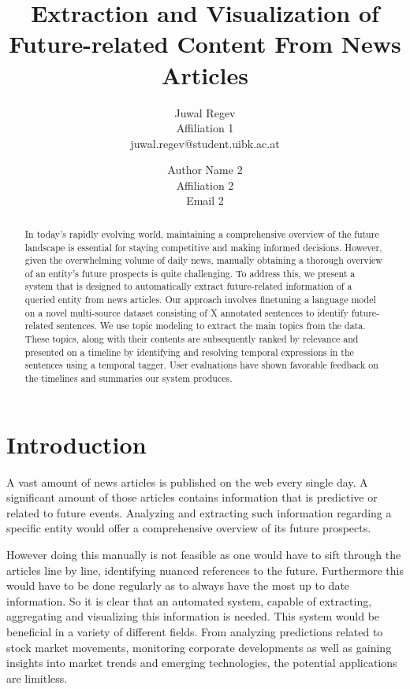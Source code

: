 \documentclass[10pt,twocolumn]{article}
\begin{document}

\title{\textbf{Extraction and Visualization of Future-related Content From News Articles}}
\author{
    Juwal Regev\\
    Affiliation 1\\
    juwal.regev@student.uibk.ac.at
    \and
    Author Name 2\\
    Affiliation 2\\
    Email 2
}
\date{} %

\maketitle

\begin{abstract}
In today's rapidly evolving world, maintaining a comprehensive overview of the future landscape is essential for staying competitive and making informed decisions. However, given the overwhelming volume of daily news, manually obtaining a thorough overview of an entity's future prospects is quite challenging. To address this, we present a system that is designed to automatically extract future-related information of a queried entity from news articles. Our approach involves finetuning a language model on a novel multi-source dataset consisting of X annotated sentences to identify future-related sentences. We use topic modeling to extract the main topics from the data. These topics, along with their contents are subsequently ranked by relevance and presented on a timeline by identifying and resolving temporal expressions in the sentences using a temporal tagger. User evaluations have shown favorable feedback on the timelines and summaries our system produces.
\end{abstract}

\section{Introduction}
A vast amount of news articles is published on the web every single day. A significant amount of those articles contains information that is predictive or related to future events. Analyzing and extracting such information regarding a specific entity would offer a comprehensive overview of its future prospects.

\noindent However doing this manually is not feasible as one would have to sift through the articles line by line, identifying nuanced references to the future. Furthermore this would have to be done regularly as to always have the most up to date information. So it is clear that an automated system, capable of extracting, aggregating and visualizing this information is needed. This system would be beneficial in a variety of different fields. From analyzing predictions related to stock market movements, monitoring corporate developments as well as gaining insights into market trends and emerging technologies, the potential applications are limitless.
\end{document}
